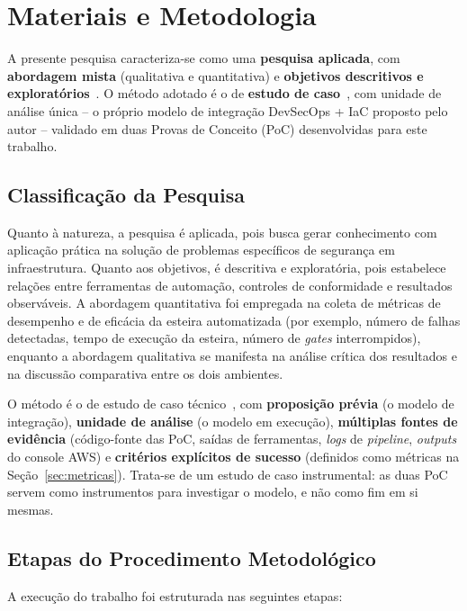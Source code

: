 \chapter{Materiais e Metodologia}

A presente pesquisa caracteriza-se como uma \textbf{pesquisa aplicada}, com \textbf{abordagem mista} (qualitativa e quantitativa) e \textbf{objetivos descritivos e exploratórios}~. O método adotado é o de \textbf{estudo de caso}~, com unidade de análise única -- o próprio modelo de integração DevSecOps + IaC proposto pelo autor -- validado em duas Provas de Conceito (PoC) desenvolvidas para este trabalho.

\section{Classificação da Pesquisa}

Quanto à natureza, a pesquisa é aplicada, pois busca gerar conhecimento com aplicação prática na solução de problemas específicos de segurança em infraestrutura. Quanto aos objetivos, é descritiva e exploratória, pois estabelece relações entre ferramentas de automação, controles de conformidade e resultados observáveis. A abordagem quantitativa foi empregada na coleta de métricas de desempenho e de eficácia da esteira automatizada (por exemplo, número de falhas detectadas, tempo de execução da esteira, número de \textit{gates} interrompidos), enquanto a abordagem qualitativa se manifesta na análise crítica dos resultados e na discussão comparativa entre os dois ambientes.

O método é o de estudo de caso técnico~, com \textbf{proposição prévia} (o modelo de integração), \textbf{unidade de análise} (o modelo em execução), \textbf{múltiplas fontes de evidência} (código-fonte das PoC, saídas de ferramentas, \textit{logs} de \textit{pipeline}, \textit{outputs} do console AWS) e \textbf{critérios explícitos de sucesso} (definidos como métricas na Seção~\ref{sec:metricas}). Trata-se de um estudo de caso instrumental: as duas PoC servem como instrumentos para investigar o modelo, e não como fim em si mesmas.

\section{Etapas do Procedimento Metodológico}

A execução do trabalho foi estruturada nas seguintes etapas:


